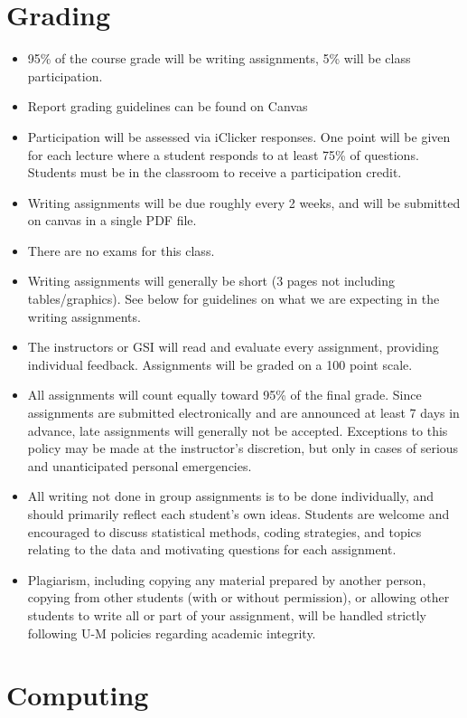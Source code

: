 \documentclass[11pt]{article}
\begin{document}
\section*{Grading}
\begin{itemize}
	\item 95\% of the course grade will be writing assignments, 5\% will be class participation.
	\item Report grading guidelines can be found on Canvas
	\item Participation will be assessed via iClicker responses.  One point will be given for each lecture where a student responds to at least 75\% of questions.  Students must be in the classroom to receive a participation credit.
	\item Writing assignments will be due roughly every 2 weeks, and will be submitted on canvas in a single PDF file.
	\item There are no exams for this class.
	\item Writing assignments will generally be short (3 pages not including tables/graphics). See below for guidelines on what we are expecting in the writing assignments.
	\item The instructors or GSI will read and evaluate every assignment, providing individual feedback. Assignments will be graded on a 100 point scale.
	\item All assignments will count equally toward 95\% of the final grade. Since assignments are submitted electronically and are announced at least 7 days in advance, late assignments will generally not be accepted. Exceptions to this policy may be made at the instructor’s discretion, but only in cases of serious and unanticipated personal emergencies.
	\item All writing not done in group assignments is to be done individually, and should primarily reflect each student’s own ideas. Students are welcome and encouraged to discuss statistical methods, coding strategies, and topics relating to the data and motivating questions for each assignment.
	\item Plagiarism, including copying any material prepared by another person, copying from other students (with or without permission), or allowing other students to write all or part of your assignment, will be handled strictly following U-M policies regarding academic integrity.
\end{itemize}

\section*{Computing}
\end{document}

